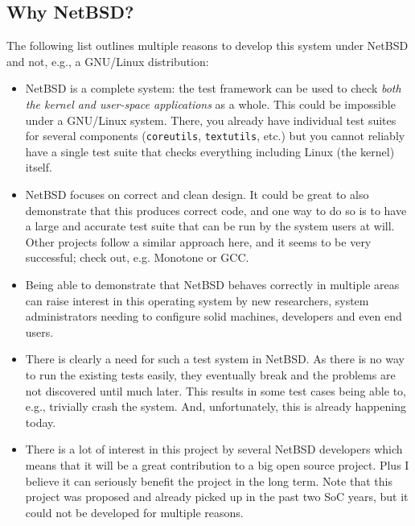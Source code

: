 \documentclass[a4paper,10pt]{article}
\begin{document}

\subsection{Why NetBSD?}

The following list outlines multiple reasons to develop this system under
NetBSD and not, e.g., a GNU/Linux distribution:

\begin{itemize}

\item NetBSD is a complete system: the test framework can be used to check
\emph{both the kernel and user-space applications} as a whole.  This could
be impossible under a GNU/Linux system.  There, you already have individual
test suites for several components (\verb*|coreutils|, \verb*|textutils|,
etc.) but you cannot reliably have a single test suite that checks
everything including Linux (the kernel) itself.

\item NetBSD focuses on correct and clean design.  It could be great to
also demonstrate that this produces correct code, and one way to do so is
to have a large and accurate test suite that can be run by the system users
at will.  Other projects follow a similar approach here, and it seems to be
very successful; check out, e.g. Monotone or GCC.

\item Being able to demonstrate that NetBSD behaves correctly in multiple
areas can raise interest in this operating system by new researchers, 
system administrators needing to configure solid machines, developers and
even end users.

\item There is clearly a need for such a test system in NetBSD.  As there
is no way to run the existing tests easily, they eventually break and the
problems are not discovered until much later.  This results in some test
cases being able to, e.g., trivially crash the system.  And, unfortunately,
this is already happening today.

\item There is a lot of interest in this project by several NetBSD
developers which means that it will be a great contribution to a big open
source project.  Plus I believe it can seriously benefit the project in the
long term.  Note that this project was proposed and already picked up in
the past two SoC years, but it could not be developed for multiple reasons.


\end{itemize}
\end{document}
